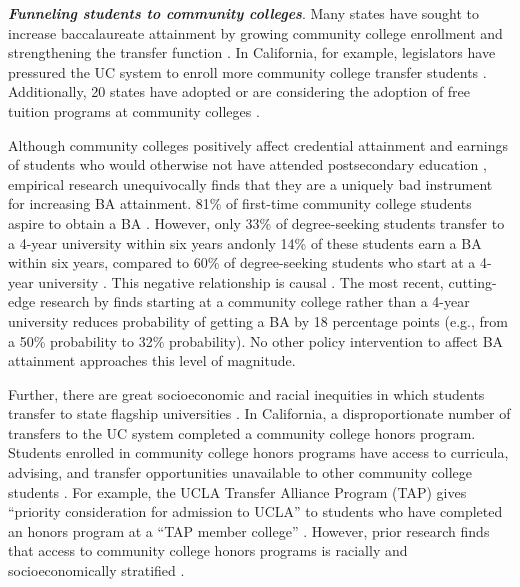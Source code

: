 \documentclass[twoside]{article}
\begin{document}

\textbf{\textit{Funneling students to community colleges}}. Many states have sought to increase baccalaureate attainment by growing community college enrollment and strengthening the transfer function \citep{RN4430,RN4431}. In California, for example, legislators have pressured the UC system to enroll more community college transfer students \citep{RN4427}. Additionally, 20 states have adopted or are considering the adoption of free tuition programs at community colleges \citep{RN4425,RN4426}.




Although community colleges positively affect credential attainment and earnings of students who would otherwise not have attended postsecondary education \citep[e.g., ][]{RN4404}, empirical research unequivocally finds that they are a uniquely bad instrument for increasing BA attainment. 81\% of first-time community college students aspire to obtain a BA \citep{RN4406}. However, only 33\% of degree-seeking students transfer to a 4-year university within six years \citep{RN4406} andonly 14\% of these students earn a BA within six years, compared to 60\% of degree-seeking students who start at a 4-year university \citep{RN4406}.  This negative relationship is causal \citep[e.g., ][]{RN4284,RN2261,RN4292,RN4405}. The most recent, cutting-edge research by \cite{RN4404} finds starting at a community college rather than a 4-year university reduces probability of getting a BA by 18 percentage points (e.g., from a 50\% probability to 32\% probability).  No other policy intervention to affect BA attainment approaches this level of magnitude.

Further, there are great socioeconomic and racial inequities in which students transfer to state flagship universities \citep{RN1492,RN4406}. In California, a disproportionate number of transfers to the UC system completed a community college honors program. Students enrolled in community college honors programs have access to curricula, advising, and transfer opportunities unavailable to other community college students \citep{RN4444,RN4443}. For example, the UCLA Transfer Alliance Program (TAP) gives ``priority consideration for admission to UCLA'' to students who have completed an honors program at a ``TAP member college'' \citep{RN4432}. However, prior research finds that access to community college honors programs is racially and socioeconomically stratified \citep{RN4440,RN4441,RN4445}.
\end{document}
